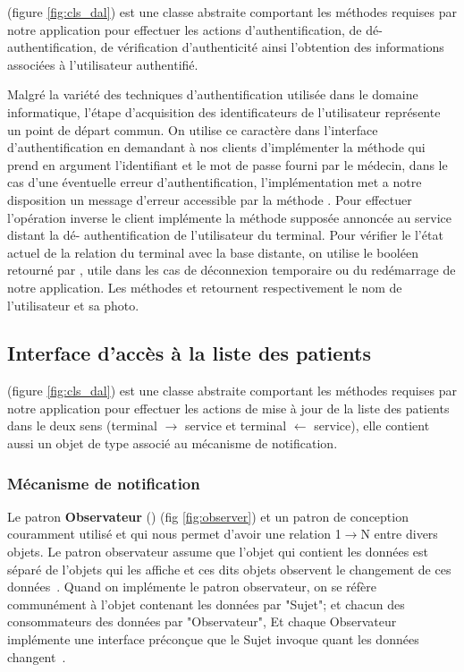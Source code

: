  (figure
\ref{fig:cls_dal}) est une classe abstraite comportant les méthodes
requises par notre application pour effectuer les actions
d'authentification, de dé-authentification, de vérification
d'authenticité ainsi l'obtention des informations associées à l'utilisateur
authentifié.

Malgré la variété des techniques d'authentification utilisée dans le domaine
informatique, l'étape d'acquisition des identificateurs de l'utilisateur
représente un point de départ commun. On utilise ce caractère dans l'interface
d'authentification en demandant à nos clients d'implémenter la méthode
 qui prend en argument l'identifiant et le mot de passe fourni par
le médecin, dans le cas d'une éventuelle erreur d'authentification,
l’implémentation met a notre disposition un message d'erreur accessible par la
méthode . Pour effectuer l’opération inverse le client
implémente la méthode  supposée annoncée au service distant la dé-
authentification de l'utilisateur du terminal. Pour vérifier le l'état actuel de
la relation du terminal avec la base distante, on utilise le booléen retourné
par , utile dans les cas de déconnexion temporaire ou du
redémarrage de notre application. Les méthodes  et
 retournent respectivement le nom de l'utilisateur et sa photo.

\subsection{Interface d’accès à la liste des patients}

 (figure \ref{fig:cls_dal}) est une classe abstraite comportant les
méthodes requises par notre application pour effectuer les actions de mise à
jour de la liste des patients dans le deux sens (terminal $\rightarrow$ service
et terminal $\leftarrow$ service), elle contient aussi un objet de type
 associé au mécanisme de notification.

\subsubsection{Mécanisme de notification}

Le patron \textbf{Observateur} () (fig
\ref{fig:observer}) et un patron de conception couramment utilisé et qui
nous permet d'avoir une relation 1$\rightarrow$N entre divers objets. Le
patron observateur assume que l'objet qui contient les données est
séparé de l'objets qui les affiche et ces dits objets observent le
changement de ces données~\cite{jdp_observer}. Quand on implémente le
patron observateur, on se réfère communément à l'objet contenant les
données par "Sujet"; et chacun des consommateurs des données par
"Observateur", Et chaque Observateur implémente une interface préconçue
que le Sujet invoque quant les données changent~\cite{jdp_observer}.

